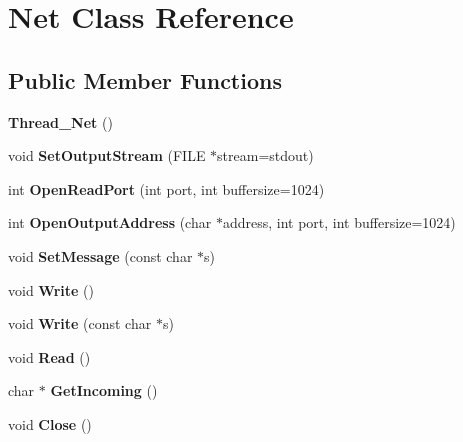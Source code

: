 \hypertarget{class_net}{}\section{Net Class Reference}
\label{class_net}
\subsection*{Public Member Functions}
\begin{DoxyCompactItemize}
\item 
\mbox{\label{class_net_af053404e61088796461ebbcb4968f3ef}} 
{\bfseries Thread\+\_\+\+Net} ()
\item 
\mbox{\label{class_net_a65003aa79c9b476e5e8f30899c1068b2}} 
void {\bfseries Set\+Output\+Stream} (F\+I\+LE $\ast$stream=stdout)
\item 
\mbox{\label{class_net_ae392ea2a9a6d616e25f72e23e13aa22b}} 
int {\bfseries Open\+Read\+Port} (int port, int buffersize=1024)
\item 
\mbox{\label{class_net_a442c203c3f075ccf396f54203b52d772}} 
int {\bfseries Open\+Output\+Address} (char $\ast$address, int port, int buffersize=1024)
\item 
\mbox{\label{class_net_ac0b75d4c0accf0d7cda1ea787129406d}} 
void {\bfseries Set\+Message} (const char $\ast$s)
\item 
\mbox{\label{class_net_a7ca78732d53f14bc73550797cc4dc972}} 
void {\bfseries Write} ()
\item 
\mbox{\label{class_net_a53a9811198455aea45c128f2cc37808b}} 
void {\bfseries Write} (const char $\ast$s)
\item 
\mbox{\label{class_net_a9f291ebfa435c730e38aa8ddf8de8ffb}} 
void {\bfseries Read} ()
\item 
\mbox{\label{class_net_a2dc15da019d5c02be4ed2ef479218811}} 
char $\ast$ {\bfseries Get\+Incoming} ()
\item 
\mbox{\label{class_net_a49253c1c086a854f3ed685b23b8b1d34}} 
void {\bfseries Close} ()

\end{DoxyCompactItemize}
